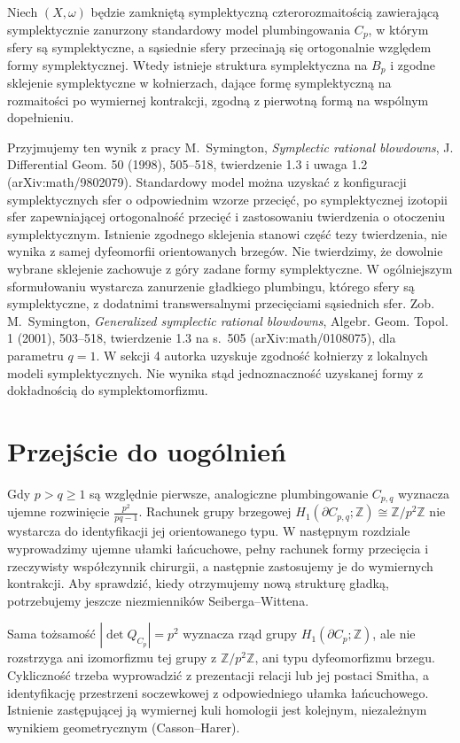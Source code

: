 \begin{twierdzenie}
Niech $(X,\omega)$ będzie zamkniętą symplektyczną
czterorozmaitością zawierającą symplektycznie
zanurzony standardowy model plumbingowania
$C_p$, w którym sfery są symplektyczne, a sąsiednie
sfery przecinają się ortogonalnie względem formy
symplektycznej. Wtedy istnieje struktura
symplektyczna na $B_p$ i zgodne sklejenie
symplektyczne w kołnierzach, dające formę
symplektyczną na rozmaitości po wymiernej
kontrakcji, zgodną z pierwotną formą na
wspólnym dopełnieniu.
\end{twierdzenie}

Przyjmujemy ten wynik z pracy M.~Symington,
\emph{Symplectic rational blowdowns},
J. Differential Geom. 50 (1998), 505--518,
twierdzenie 1.3 i uwaga 1.2
(arXiv:math/9802079). Standardowy model można
uzyskać z konfiguracji symplektycznych sfer
o odpowiednim wzorze przecięć, po symplektycznej
izotopii sfer zapewniającej ortogonalność
przecięć i zastosowaniu twierdzenia o otoczeniu
symplektycznym. Istnienie zgodnego sklejenia
stanowi część tezy twierdzenia, nie wynika
z samej dyfeomorfii orientowanych brzegów.
Nie twierdzimy, że dowolnie wybrane sklejenie
zachowuje z góry zadane formy symplektyczne.
W ogólniejszym sformułowaniu wystarcza
zanurzenie gładkiego plumbingu, którego sfery
są symplektyczne, z dodatnimi transwersalnymi
przecięciami sąsiednich sfer. Zob.
M.~Symington, \emph{Generalized symplectic
rational blowdowns}, Algebr. Geom. Topol. 1
(2001), 503--518, twierdzenie 1.3 na s.~505
(arXiv:math/0108075), dla parametru $q=1$.
W sekcji 4 autorka uzyskuje zgodność
kołnierzy z lokalnych modeli symplektycznych.
Nie wynika stąd jednoznaczność uzyskanej
formy z dokładnością do symplektomorfizmu.

\section{Przejście do uogólnień}
\label{sec:tg-rb-general}
Gdy $p>q\geq1$ są względnie pierwsze, analogiczne
plumbingowanie $C_{p,q}$ wyznacza ujemne rozwinięcie
$\frac{p^2}{pq-1}$. Rachunek grupy brzegowej
$H_1(\partial C_{p,q};\mathbb Z)\cong\mathbb Z/p^2\mathbb Z$
nie wystarcza do identyfikacji jej orientowanego typu.
W następnym rozdziale wyprowadzimy ujemne ułamki łańcuchowe,
pełny rachunek formy przecięcia i rzeczywisty współczynnik
chirurgii, a następnie zastosujemy je do wymiernych kontrakcji.
Aby sprawdzić, kiedy otrzymujemy nową strukturę gładką,
potrzebujemy jeszcze niezmienników Seiberga--Wittena.

\begin{uwaga}
Sama tożsamość $|\det Q_{C_p}|=p^2$ wyznacza rząd
grupy $H_1(\partial C_p;\mathbb Z)$, ale nie rozstrzyga
ani izomorfizmu tej grupy z $\mathbb Z/p^2\mathbb Z$,
ani typu dyfeomorfizmu brzegu. Cykliczność trzeba
wyprowadzić z prezentacji relacji lub jej postaci Smitha,
a identyfikację przestrzeni soczewkowej z odpowiedniego
ułamka łańcuchowego. Istnienie zastępującej ją wymiernej
kuli homologii jest kolejnym, niezależnym wynikiem
geometrycznym (Casson--Harer).
\end{uwaga}

